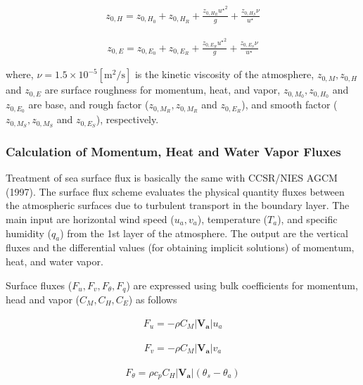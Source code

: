 \begin{eqnarray}
    z_{0,H} = z_{0,H_0} + z_{0,H_R} + \frac{z_{0,H_R} {u^\star }^2 }{g} + \frac{z_{0,H_S}\nu }{u^\star}
\end{eqnarray}

\begin{eqnarray}
    z_{0,E} = z_{0,E_0} + z_{0,E_R} + \frac{z_{0,E_R} {u^\star }^2 }{g} + \frac{z_{0,E_S}\nu }{u^\star}
\end{eqnarray}

where, \(\nu = 1.5 \times 10^{-5} \mathrm{[m^2/s]}\) is the kinetic
viscosity of the atmosphere, \(z_{0,M},z_{0,H}\) and \(z_{0,E}\) are
surface roughness for momentum, heat, and vapor, \(z_{0,M_0},z_{0,H_0}\)
and \(z_{0,E_0}\) are base, and rough factor (\(z_{0,M_R},z_{0,M_R}\)
and \(z_{0,E_R}\)), and smooth factor (\(z_{0,M_S},z_{0,M_S}\) and
\(z_{0,E_S}\)), respectively.

\hypertarget{calculation-of-momentum-heat-and-water-vapor-fluxes}{%
\subsubsection{Calculation of Momentum, Heat and Water Vapor
Fluxes}\label{calculation-of-momentum-heat-and-water-vapor-fluxes}}

Treatment of sea surface flux is basically the same with CCSR/NIES AGCM
(1997). The surface flux scheme evaluates the physical quantity fluxes
between the atmospheric surfaces due to turbulent transport in the
boundary layer. The main input are horizontal wind speed (\(u_a, v_a\)),
temperature (\(T_a\)), and specific humidity (\(q_a\)) from the 1st
layer of the atmosphere. The output are the vertical fluxes and the
differential values (for obtaining implicit solutions) of momentum,
heat, and water vapor.

Surface fluxes (\(F_u, F_v, F_\theta, F_q\)) are expressed using bulk
coefficients for momentum, head and vapor (\(C_M, C_H, C_E\)) as follows

\begin{eqnarray}
    F_u  =  - \rho C_M |\mathbf{V_a}| u_a
\end{eqnarray}

\begin{eqnarray}
    F_v  =  - \rho C_M |\mathbf{V_a}| v_a
\end{eqnarray}

\begin{eqnarray}
    F_\theta  = \rho c_p C_H |\mathbf{V_a}| ( \theta_s - \theta_a )
\end{eqnarray}

